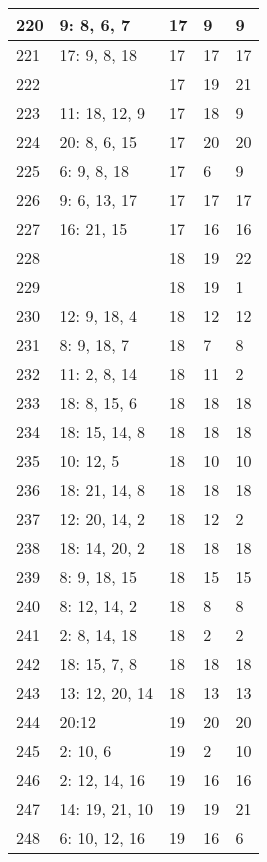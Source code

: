 \documentclass{article} %
\begin{document}
\begin{longtable}{| l | l | l | l | l |}
        220 & 9: 8, 6, 7 & 17 & 9 & 9 \\ \hline
        221 & 17: 9, 8, 18 & 17 & 17 & 17 \\ \hline
        222 &  & 17 & 19 & 21 \\ \hline
        223 & 11: 18, 12, 9 & 17 & 18 & 9 \\ \hline
        224 & 20: 8, 6, 15 & 17 & 20 & 20 \\ \hline
        225 & 6: 9, 8, 18 & 17 & 6 & 9 \\ \hline
        226 & 9: 6, 13, 17 & 17 & 17 & 17 \\ \hline
        227 & 16: 21, 15 & 17 & 16 & 16 \\ \hline
        228 &  & 18 & 19 & 22 \\ \hline
        229 &  & 18 & 19 & 1 \\ \hline
        230 & 12: 9, 18, 4 & 18 & 12 & 12 \\ \hline
        231 & 8: 9, 18, 7 & 18 & 7 & 8 \\ \hline
        232 & 11: 2, 8, 14 & 18 & 11 & 2 \\ \hline
        233 & 18: 8, 15, 6 & 18 & 18 & 18 \\ \hline
        234 & 18: 15, 14, 8 & 18 & 18 & 18 \\ \hline
        235 & 10: 12, 5 & 18 & 10 & 10 \\ \hline
        236 & 18: 21, 14, 8 & 18 & 18 & 18 \\ \hline
        237 & 12: 20, 14, 2 & 18 & 12 & 2 \\ \hline
        238 & 18: 14, 20, 2 & 18 & 18 & 18 \\ \hline
        239 & 8: 9, 18, 15 & 18 & 15 & 15 \\ \hline
        240 & 8: 12, 14, 2 & 18 & 8 & 8 \\ \hline
        241 & 2: 8, 14, 18 & 18 & 2 & 2 \\ \hline
        242 & 18: 15, 7, 8 & 18 & 18 & 18 \\ \hline
        243 & 13: 12, 20, 14 & 18 & 13 & 13 \\ \hline
        244 & 20:12 & 19 & 20 & 20 \\ \hline
        245 & 2: 10, 6 & 19 & 2 & 10 \\ \hline
        246 & 2: 12, 14, 16 & 19 & 16 & 16 \\ \hline
        247 & 14: 19, 21, 10 & 19 & 19 & 21 \\ \hline
        248 & 6: 10, 12, 16 & 19 & 16 & 6 \\ \hline

\end{longtable}
\end{document}
